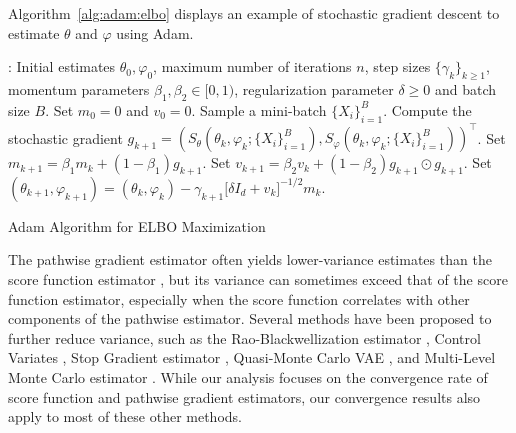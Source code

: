 \documentclass[english,graybox,envcountchap,envcountsame,sectrefs,shortlabels]{svmono}
\theoremstyle{style}
\begin{document}
Algorithm~\ref{alg:adam:elbo} displays an example of stochastic gradient descent to estimate $\theta$ and $\varphi$ using Adam.
\begin{algorithm}
\centering
\begin{algorithmic}
: Initial estimates $\theta_{0}, \varphi_{0}$, maximum number of iterations $n$, step sizes $\{\gamma_{k}\}_{k \geq 1}$, momentum parameters $\beta_{1}, \beta_{2} \in [0,1)$, regularization parameter $\delta \geq 0$ and batch size $B$.
\State Set $m_{0} = 0$ and $v_{0} = 0$.
\State Sample a mini-batch $\{X_{i}\}_{i=1}^B$.
\State Compute the stochastic gradient $g_{k+1} = (S_{\theta}(\theta_k, \varphi_k; \{X_i\}_{i=1}^B),S_{\varphi}(\theta_k, \varphi_k; \{X_i\}_{i=1}^B))^\top$. 
\State Set $m_{k+1} = \beta_{1}m_{k} + (1-\beta_{1})g_{k+1}$.
\State Set $v_{k+1} = \beta_{2}v_{k} + (1-\beta_{2}) g_{k+1} \odot g_{k+1}$.
\State Set $(\theta_{k+1}, \varphi_{k+1}) = (\theta_{k}, \varphi_{k}) -\gamma_{k+1}\big[\delta \mathit{I}_d + v_{k} \big]^{-1/2} m_{k}$.
\EndFor
\end{algorithmic}
\caption{Adam Algorithm for ELBO Maximization}
\label{alg:adam:elbo}
\end{algorithm}

The pathwise gradient estimator often yields lower-variance estimates than the score function estimator \cite{miller2017reducing, buchholz2018quasi}, but its variance can sometimes exceed that of the score function estimator, especially when the score function correlates with other components of the pathwise estimator.
Several methods have been proposed to further reduce variance, such as the Rao-Blackwellization estimator \cite{ranganath2014black}, Control Variates \cite{lievin2020optimal}, Stop Gradient estimator \cite{roeder2017sticking}, Quasi-Monte Carlo VAE \cite{buchholz2018quasi}, and Multi-Level Monte Carlo estimator \cite{fujisawa2021multilevel, he2022unbiased}. While our analysis focuses on the convergence rate of score function and pathwise gradient estimators, our convergence results also apply to most of these other methods.
\end{document}
